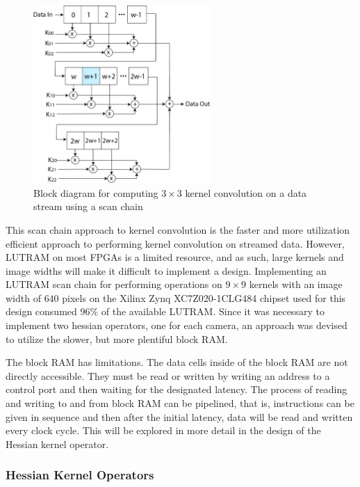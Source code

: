 \documentclass{article}
\begin{document}
\begin{figure}[h]
	\centering
	\includegraphics[width=0.6\textwidth]{figures/block/scanchain}
	\caption{Block diagram for computing $3 \times 3$ kernel convolution on a data stream using a scan chain}
	\label{fig_block_scanchain}
\end{figure}

This scan chain approach to kernel convolution is the faster and more utilization efficient approach to performing kernel convolution on streamed data. However, LUTRAM on most FPGAs is a limited resource, and as such, large kernels and image widths will make it difficult to implement a design. Implementing an LUTRAM scan chain for performing operations on $9 \times 9$ kernels with an image width of $640$ pixels on the Xilinx Zynq XC7Z020-1CLG484 chipset used for this design consumed $96\%$ of the available LUTRAM. Since it was necessary to implement two hessian operators, one for each camera, an approach was devised to utilize the slower, but more plentiful block RAM.

The block RAM has limitations. The data cells inside of the block RAM are not directly accessible. They must be read or written by writing an address to a control port and then waiting for the designated latency. The process of reading and writing to and from block RAM can be pipelined, that is, instructions can be given in sequence and then after the initial latency, data will be read and written every clock cycle. This will be explored in more detail in the design of the Hessian kernel operator.

\subsubsection{Hessian Kernel Operators}
\end{document}
